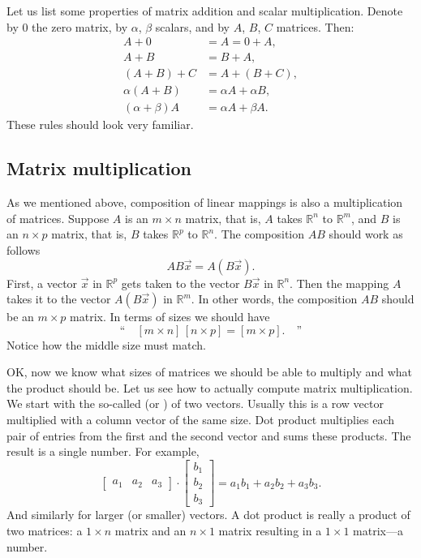 Let us list some properties of matrix addition and scalar multiplication.
Denote by $0$ the zero matrix, by
$\alpha$, $\beta$ scalars, and by $A$, $B$, $C$ matrices.  Then:
\begin{align*}
A + 0 & = A = 0 + A , \\
A + B & = B + A , \\
(A + B) + C & = A + (B + C) , \\
\alpha(A+B) & = \alpha A+\alpha B, \\
(\alpha+\beta)A & = \alpha A + \beta A.
\end{align*}
These rules should look very familiar.

\subsection{Matrix multiplication}

As we mentioned above, composition of linear mappings is also a
multiplication of matrices.  Suppose $A$ is an $m \times n$ matrix,
that is, $A$ takes
${\mathbb R}^n$ to
${\mathbb R}^m$,
and $B$ is an $n \times p$ matrix, that is, $B$ takes
${\mathbb R}^p$ to
${\mathbb R}^n$.  The composition $AB$ should work as follows
\begin{equation*}
AB\vec{x} = A(B\vec{x}) .
\end{equation*}
First, a vector $\vec{x}$ in ${\mathbb R}^p$ gets taken to 
the vector $B\vec{x}$ in
${\mathbb R}^n$.  Then the mapping $A$ takes it to the vector $A(B\vec{x})$
in ${\mathbb R}^m$.  In other words, the composition $AB$ should be an $m
\times p$ matrix.  In terms of sizes we should have
\begin{equation*}
\text{``}
\quad
[ m \times n ]
\,
[ n \times p ]
=
[ m \times p ] . \quad
\text{''}
\end{equation*}
Notice how the middle size must match.

OK\@, now we know what sizes of matrices we should be able to multiply
and what the product should be.
Let us see how to actually compute matrix multiplication.
We start with the so-called
\emph{} (or \emph{}) of two vectors.
Usually this is a row vector multiplied
with a column vector of the same size.  Dot product multiplies
each pair of entries from the first and the second vector and sums these
products.  The result is a single number.
For example,
\begin{equation*}
\begin{bmatrix}
a_1 & a_2 & a_3
\end{bmatrix}
\cdot
\begin{bmatrix}
b_1 \\
b_2 \\
b_3
\end{bmatrix}
= a_1 b_1 + a_2 b_2 + a_3 b_3 .
\end{equation*}
And similarly for larger (or smaller) vectors.
A dot product is really a product of two matrices: a $1 \times n$ matrix
and an $n \times 1$ matrix resulting in
a $1 \times 1$ matrix---a number.

